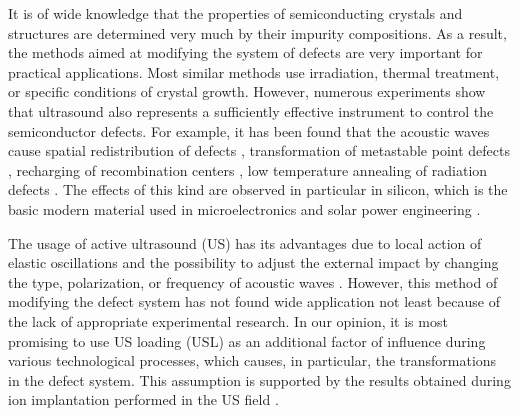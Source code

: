 \documentclass[%
 aip,jap,
 amsmath,amssymb,
 reprint,%
]{revtex4-1}
\begin{document}
It is of wide knowledge that the properties of semiconducting crystals and structures are determined very much by their impurity compositions.
As a result, the methods aimed at modifying the system of defects are very important for practical applications.
Most similar methods use irradiation, thermal treatment, or specific conditions of crystal growth.
However, numerous experiments show that ultrasound also represents a sufficiently effective instrument to control the semiconductor defects.
For example, it has been found that the acoustic waves cause
spatial redistribution of defects \cite{Roman:2010JAP,GORB2020,Ostapenko1999,Zaveryukhin2002,Zaver:2008,OstapSC},
transformation of metastable point defects \cite{buyanova1994,Ostrovskii2001,Wosinski},
recharging of recombination centers \cite{Olikh:Ultras,Korotchenkov1995},
low temperature annealing of radiation defects \cite{Podolian2012,YOlikh2006TPL,UST:OstrovCsI,Parchinskii2006,UST:LED_SM}.
The effects of this kind are observed in particular in silicon, which is the basic modern material used in microelectronics and solar power engineering \cite{Roman:2010JAP,GORB2020,Zaver:2008,Roman:2007APL,OlikhJAP,Ostrovskii2001,Podolian2012,Parchinskii2006}.

The usage of active ultrasound (US) has its advantages due to
local action of elastic oscillations
and the possibility to adjust the external impact by changing the type, polarization, or frequency of acoustic waves \cite{Olikh2018JAP}.
However, this method of modifying the defect system has not found wide application not least because of the lack of appropriate experimental research.
In our opinion, it is most promising to use US loading (USL) as an additional factor of influence during various technological processes, which causes, in particular, the transformations in the defect system.
This assumption is supported by the results obtained during ion implantation performed in the US field \cite{Roman:2010JAP,Roman:2007APL,Roman:2006JAP}.
\end{document}
